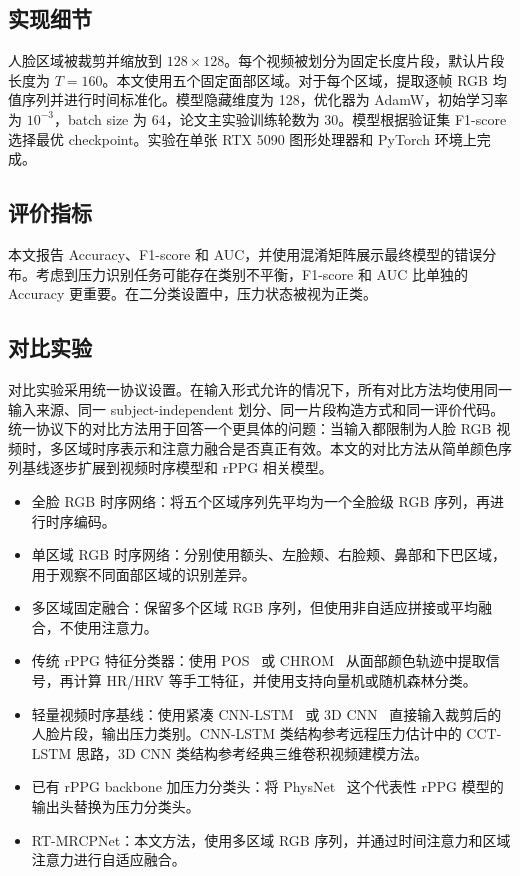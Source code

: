 \documentclass[runningheads]{llncs}
\begin{document}
\subsection{实现细节}

人脸区域被裁剪并缩放到 $128 \times 128$。每个视频被划分为固定长度片段，默认片段长度为 $T=160$。本文使用五个固定面部区域。对于每个区域，提取逐帧 RGB 均值序列并进行时间标准化。模型隐藏维度为 128，优化器为 AdamW，初始学习率为 $10^{-3}$，batch size 为 64，论文主实验训练轮数为 30。模型根据验证集 F1-score 选择最优 checkpoint。实验在单张 RTX 5090 图形处理器和 PyTorch 环境上完成。

\subsection{评价指标}

本文报告 Accuracy、F1-score 和 AUC，并使用混淆矩阵展示最终模型的错误分布。考虑到压力识别任务可能存在类别不平衡，F1-score 和 AUC 比单独的 Accuracy 更重要。在二分类设置中，压力状态被视为正类。

\subsection{对比实验}

对比实验采用统一协议设置。在输入形式允许的情况下，所有对比方法均使用同一输入来源、同一 subject-independent 划分、同一片段构造方式和同一评价代码。统一协议下的对比方法用于回答一个更具体的问题：当输入都限制为人脸 RGB 视频时，多区域时序表示和注意力融合是否真正有效。本文的对比方法从简单颜色序列基线逐步扩展到视频时序模型和 rPPG 相关模型。
\begin{itemize}
    \item 全脸 RGB 时序网络：将五个区域序列先平均为一个全脸级 RGB 序列，再进行时序编码。
    \item 单区域 RGB 时序网络：分别使用额头、左脸颊、右脸颊、鼻部和下巴区域，用于观察不同面部区域的识别差异。
    \item 多区域固定融合：保留多个区域 RGB 序列，但使用非自适应拼接或平均融合，不使用注意力。
    \item 传统 rPPG 特征分类器：使用 POS~\cite{wang2017pos} 或 CHROM~\cite{dehaan2013chrom} 从面部颜色轨迹中提取信号，再计算 HR/HRV 等手工特征，并使用支持向量机或随机森林分类。
    \item 轻量视频时序基线：使用紧凑 CNN-LSTM ~\cite{ziaratnia2024cctlstm}或 3D CNN ~\cite{tran2015c3d}直接输入裁剪后的人脸片段，输出压力类别。CNN-LSTM 类结构参考远程压力估计中的 CCT-LSTM 思路，3D CNN 类结构参考经典三维卷积视频建模方法。
    \item 已有 rPPG backbone 加压力分类头：将 PhysNet~\cite{yu2019physnet} 这个代表性 rPPG 模型的输出头替换为压力分类头。
    \item RT-MRCPNet：本文方法，使用多区域 RGB 序列，并通过时间注意力和区域注意力进行自适应融合。
\end{itemize}
\end{document}
